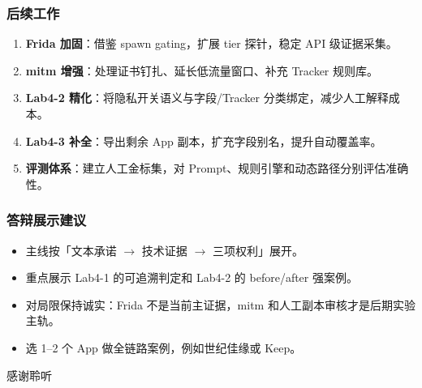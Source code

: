 \documentclass[AutoFakeBold,AutoFakeSlant]{beamer}
\newcommand{\arrown}{\ensuremath{\rightarrow}}
\begin{document}
\begin{frame}
    \frametitle{后续工作}
    \small
    \begin{enumerate}
        \item \textbf{Frida 加固}：借鉴 spawn gating，扩展 tier 探针，稳定 API 级证据采集。
        \item \textbf{mitm 增强}：处理证书钉扎、延长低流量窗口、补充 Tracker 规则库。
        \item \textbf{Lab4-2 精化}：将隐私开关语义与字段/Tracker 分类绑定，减少人工解释成本。
        \item \textbf{Lab4-3 补全}：导出剩余 App 副本，扩充字段别名，提升自动覆盖率。
        \item \textbf{评测体系}：建立人工金标集，对 Prompt、规则引擎和动态路径分别评估准确性。
    \end{enumerate}
\end{frame}

\begin{frame}
    \frametitle{答辩展示建议}
    \small
    \begin{itemize}
        \item 主线按「文本承诺 \arrown{} 技术证据 \arrown{} 三项权利」展开。
        \item 重点展示 Lab4-1 的可追溯判定和 Lab4-2 的 before/after 强案例。
        \item 对局限保持诚实：Frida 不是当前主证据，mitm 和人工副本审核才是后期实验主轨。
        \item 选 1--2 个 App 做全链路案例，例如世纪佳缘或 Keep。
    \end{itemize}
\end{frame}

\begin{frame}
    \centering
    \Huge 感谢聆听
\end{frame}
\end{document}
